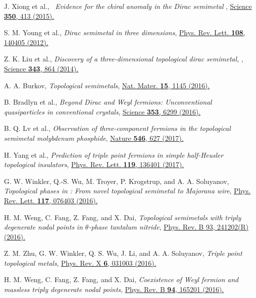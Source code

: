 \documentclass[aps,prl,floatfix,twocolumn,reprint]{revtex4}
\begin{document}
\begin{thebibliography}{99}
 J. Xiong et al., \textit{\ Evidence for the chiral anomaly
in the Dirac semimetal }, \href{https://doi.org/10.1126/science.aac6089}%
{Science \textbf{350}, 413 (2015).}

 S. M. Young et al., \textit{Dirac semimetal in three
dimensions}, \href{https://doi.org/10.1103/PhysRevLett.108.140405}{Phys.
Rev. Lett. \textbf{108}, 140405 (2012).}

 Z. K. Liu et al., \textit{Discovery of a three-dimensional
topological dirac semimetal, }, \href{https://doi.org/10.1126/science.1245085}%
{Science \textbf{343}, 864 (2014).}

 A. A. Burkov, \textit{Topological semimetals}, \href{https://doi.org/10.1038/nmat4788}%
{Nat. Mater. \textbf{15}, 1145 (2016).}

 B. Bradlyn et al., \textit{Beyond Dirac and Weyl fermions:
Unconventional quasiparticles in conventional crystals}, \href{https://doi.org/10.1126/science.aaf5037}%
{Science \textbf{353}, 6299 (2016).}

 B. Q. Lv et al., \textit{Observation of three-component
fermions in the topological semimetal molybdenum phosphide}, \href{https://doi.org/10.1038/nature22390}%
{Nature \textbf{546}, 627 (2017).}

 H. Yang et al., \textit{Prediction of triple point fermions in
simple half-Heusler topological insulators}, \href{https://doi.org/10.1103/PhysRevLett.119.136401}%
{Phys. Rev. Lett. \textbf{119}, 136401 (2017).}

 G. W. Winkler, Q.-S. Wu, M. Troyer, P. Krogstrup, and A. A.
Soluyanov, \textit{Topological phases in : From novel
topological semimetal to Majorana wire}, \href{https://doi.org/10.1103/PhysRevLett.117.076403}%
{Phys. Rev. Lett. \textbf{117}, 076403 (2016).}

 H. M. Weng, C. Fang, Z. Fang, and X. Dai, \textit{Topological
semimetals with triply degenerate nodal points in $\theta$-phase tantalum
nitride}, \href{https://doi.org/10.1103/PhysRevB.93.241202}{Phys. Rev. B 93,
241202(R) (2016).}

 Z. M. Zhu, G. W. Winkler, Q. S. Wu, J. Li, and A. A.
Soluyanov, \textit{Triple point topological metals}, \href{https://doi.org/10.1103/PhysRevX.6.031003}%
{Phys. Rev. X \textbf{6}, 031003 (2016).}

 H. M. Weng, C. Fang, Z. Fang, and X. Dai, \textit{Coexistence
of Weyl fermion and massless triply degenerate nodal points}, \href{https://doi.org/10.1103/PhysRevB.94.165201}%
{Phys. Rev. B \textbf{94}, 165201 (2016).}


\end{thebibliography}
\end{document}
